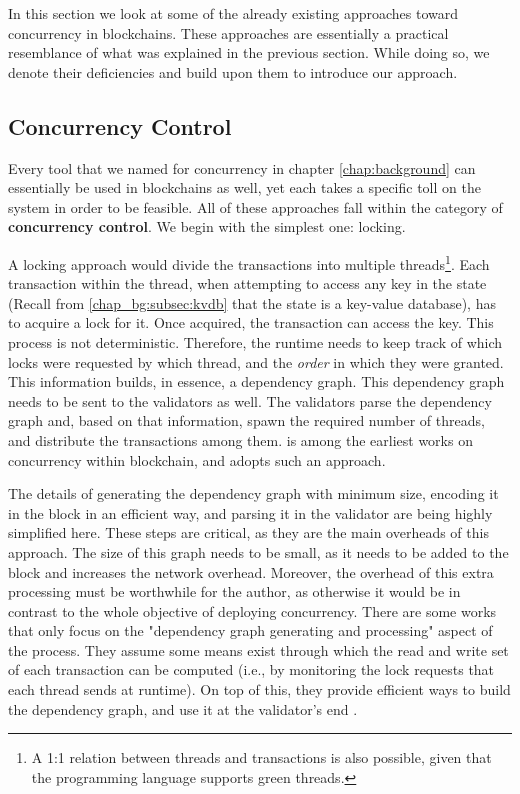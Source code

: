 In this section we look at some of the already existing approaches toward concurrency in
blockchains. These approaches are essentially a practical resemblance of what was explained in the
previous section. While doing so, we denote their deficiencies and build upon them to introduce our
approach.

\subsection*{Concurrency Control}

Every tool that we named for concurrency in chapter \ref{chap:background} can essentially be used in
blockchains as well, yet each takes a specific toll on the system in order to be feasible. All of
these approaches fall within the category of \textbf{concurrency control}. We begin with the
simplest one: locking.

A locking approach would divide the transactions into multiple threads\footnote{A 1:1 relation
between threads and transactions is also possible, given that the programming language supports
green threads.}. Each transaction within the thread, when attempting to access any key in the state
(Recall from \ref{chap_bg:subsec:kvdb} that the state is a key-value database), has to acquire a
lock for it. Once acquired, the transaction can access the key. This process is not deterministic.
Therefore, the runtime needs to keep track of which locks were requested by which thread, and the
\textit{order} in which they were granted. This information builds, in essence, a dependency graph.
This dependency graph needs to be sent to the validators as well. The validators parse the
dependency graph and, based on that information, spawn the required number of threads, and
distribute the transactions among them. \cite{dickersonSmartLocksAddingConcurrency2017} is among the
earliest works on concurrency within blockchain, and adopts such an approach.

The details of generating the dependency graph with minimum size, encoding it in the block in an
efficient way, and parsing it in the validator are being highly simplified here. These steps are
critical, as they are the main overheads of this approach. The size of this graph needs to be small,
as it needs to be added to the block and increases the network overhead. Moreover, the overhead of
this extra processing must be worthwhile for the author, as otherwise it would be in contrast to the
whole objective of deploying concurrency. There are some works that only focus on the "dependency
graph generating and processing" aspect of the process. They assume some means exist through which
the read and write set of each transaction can be computed (i.e., by monitoring the lock requests
that each thread sends at runtime). On top of this, they provide efficient ways to build the
dependency graph, and use it at the validator's end \cite{EnablingConcurrencySmart2018}.

